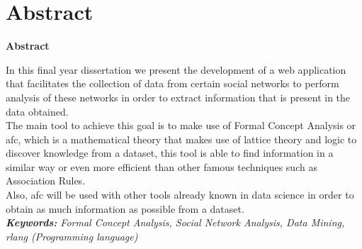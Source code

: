 \documentclass[../main.tex]{subfiles}
\begin{document}
\makeatletter
\renewenvironment{abstract}{%
    \if@twocolumn
      \section*{Abstract \\}%
    \else %
    \begin{flushright}
        {\filleft\Huge\bfseries\fontsize{48pt}{12}\selectfont Abstract\vspace{\z@}}%
        \end{flushright}
      \quotation
    \fi}
    {\if@twocolumn\else\endquotation\fi}
\makeatother
\begin{abstract}

In this final year dissertation we present the development of a web application that facilitates the collection of data from certain social networks to perform analysis of these networks in order to extract information that is present in the data obtained. \\

The main tool to achieve this goal is to make use of Formal Concept Analysis or \gls{afc}, which is a mathematical theory that makes use of lattice theory and logic to discover knowledge from a dataset, this tool is able to find information in a similar way or even more efficient than other famous techniques such as Association Rules. \\

Also, \Gls{afc} will be used with other tools already known in data science in order to obtain as much information as possible from a dataset. \\

\noindent\textit{\textbf{Keywords:} Formal Concept Analysis, Social Network Analysis, Data Mining, \gls{rlang} (Programming language)}
\end{abstract}
\end{document}
